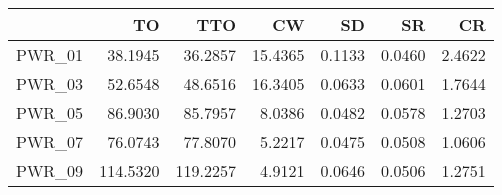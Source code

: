 \begin{tabular}{rrrrrrr}
  \toprule
 & TO & TTO & CW & SD & SR & CR \\ 
  \midrule
PWR\_01 & 38.1945 & 36.2857 & 15.4365 & 0.1133 & 0.0460 & 2.4622 \\ 
  PWR\_03 & 52.6548 & 48.6516 & 16.3405 & 0.0633 & 0.0601 & 1.7644 \\ 
  PWR\_05 & 86.9030 & 85.7957 & 8.0386 & 0.0482 & 0.0578 & 1.2703 \\ 
  PWR\_07 & 76.0743 & 77.8070 & 5.2217 & 0.0475 & 0.0508 & 1.0606 \\ 
  PWR\_09 & 114.5320 & 119.2257 & 4.9121 & 0.0646 & 0.0506 & 1.2751 \\ 
   \bottomrule
\end{tabular}
